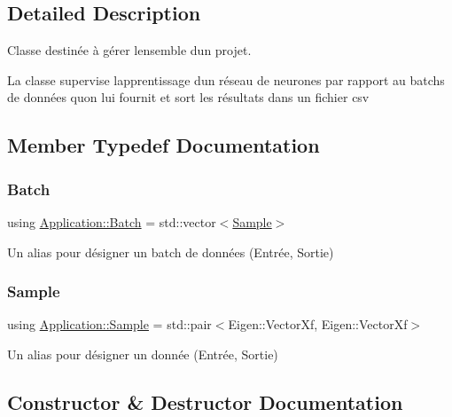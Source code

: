 \subsection{Detailed Description}
Classe destinée à gérer l\textquotesingle{}ensemble d\textquotesingle{}un projet. 

La classe supervise l\textquotesingle{}apprentissage d\textquotesingle{}un réseau de neurones par rapport au batchs de données qu\textquotesingle{}on lui fournit et sort les résultats dans un fichier csv 

\subsection{Member Typedef Documentation}
\mbox{\label{classApplication_a9888f02149ca3b8ffa499ee07426cd1d}} 
\subsubsection{\texorpdfstring{Batch}{Batch}}
{\footnotesize\ttfamily using \hyperlink{classApplication_a9888f02149ca3b8ffa499ee07426cd1d}{Application\+::\+Batch} =  std\+::vector$<$\hyperlink{classApplication_add64c430fa6318ac4885ea5ddedf0780}{Sample}$>$}



Un alias pour désigner un batch de données (Entrée, Sortie) 

\mbox{\label{classApplication_add64c430fa6318ac4885ea5ddedf0780}} 
\subsubsection{\texorpdfstring{Sample}{Sample}}
{\footnotesize\ttfamily using \hyperlink{classApplication_add64c430fa6318ac4885ea5ddedf0780}{Application\+::\+Sample} =  std\+::pair$<$Eigen\+::\+Vector\+Xf, Eigen\+::\+Vector\+Xf$>$}



Un alias pour désigner un donnée (Entrée, Sortie) 



\subsection{Constructor \& Destructor Documentation}
\mbox{\label{classApplication_ab46d83da0e069b75ab971725bcf24a54}} 
